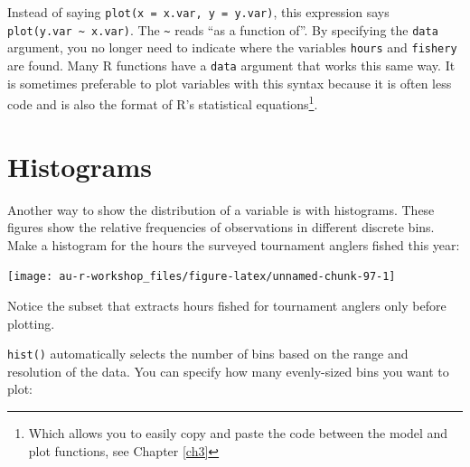 \documentclass[]{book}
\newenvironment{Shaded}{\begin{snugshade}}{\end{snugshade}}
\newcommand{\KeywordTok}[1]{\textcolor[rgb]{0.13,0.29,0.53}{\textbf{#1}}}
\newcommand{\DataTypeTok}[1]{\textcolor[rgb]{0.13,0.29,0.53}{#1}}
\newcommand{\DecValTok}[1]{\textcolor[rgb]{0.00,0.00,0.81}{#1}}
\newcommand{\StringTok}[1]{\textcolor[rgb]{0.31,0.60,0.02}{#1}}
\newcommand{\CommentTok}[1]{\textcolor[rgb]{0.56,0.35,0.01}{\textit{#1}}}
\newcommand{\OperatorTok}[1]{\textcolor[rgb]{0.81,0.36,0.00}{\textbf{#1}}}
\newcommand{\NormalTok}[1]{#1}
\let\rmarkdownfootnote\footnote%
\def\footnote{\protect\rmarkdownfootnote}
\theoremstyle{definition}
\theoremstyle{definition}
\theoremstyle{definition}
\theoremstyle{remark}
\begin{document}
Instead of saying \texttt{plot(x\ =\ x.var,\ y\ =\ y.var)}, this
expression says \texttt{plot(y.var\ \textasciitilde{}\ x.var)}. The
\texttt{\textasciitilde{}} reads ``as a function of''. By specifying the
\texttt{data} argument, you no longer need to indicate where the
variables \texttt{hours} and \texttt{fishery} are found. Many R
functions have a \texttt{data} argument that works this same way. It is
sometimes preferable to plot variables with this syntax because it is
often less code and is also the format of R's statistical
equations\footnote{Which allows you to easily copy and paste the code
  between the model and plot functions, see Chapter \ref{ch3}}.

\section{Histograms}\label{histograms}

Another way to show the distribution of a variable is with histograms.
These figures show the relative frequencies of observations in different
discrete bins. Make a histogram for the hours the surveyed tournament
anglers fished this year:

\begin{Shaded}
\end{Shaded}

\begin{center}\texttt{[image: au-r-workshop\_files/figure-latex/unnamed-chunk-97-1]} \end{center}

Notice the subset that extracts hours fished for tournament anglers only
before plotting.

\texttt{hist()} automatically selects the number of bins based on the
range and resolution of the data. You can specify how many evenly-sized
bins you want to plot:

\begin{Shaded}
\end{Shaded}
\end{document}
